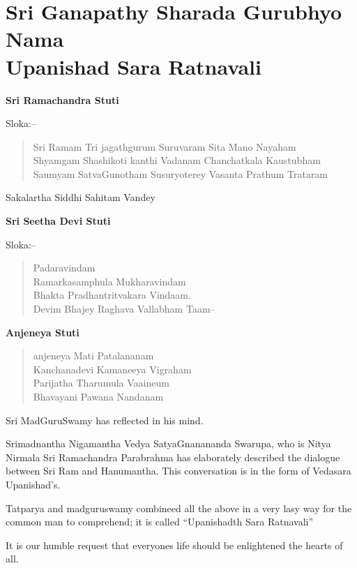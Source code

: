 
\chapter*{Sri Ganapathy Sharada Gurubhyo Nama\\ Upanishad Sara Ratnavali}

\begin{center}
\textbf{Sri Ramachandra Stuti}
\end{center}

Sloka:–

\begin{verse}
 Sri Ramam Tri jagathgurum Suruvaram Sita Mano Nayaham \\
 Shyamgam Shashikoti kanthi Vadanam Chanchatkala Kaustubham \\
 Saumyam SatvaGunotham Susuryoterey Vasanta Prathum Trataram
\end{verse}

\begin{center}
Sakalartha Siddhi Sahitam Vandey
\end{center}

\begin{center}
\end{center}

\begin{center}
\textbf{Sri Seetha Devi Stuti}
\end{center}

Sloka:–

\begin{verse}
  Padaravindam\\
 Ramarkasamphula Mukharavindam\\
 Bhakta Pradhantritvakara Vindaam.\\
 Devim Bhajey Raghava Vallabham Taam–
\end{verse}

\begin{center}
\textbf{Anjeneya Stuti}
\end{center}

\begin{verse}
 anjeneya Mati Patalananam \\
 Kanchanadevi Kamaneeya Vigraham\\
 Parijatha Tharumula Vaaineum\\
 Bhavayani Pawana Nandanam
\end{verse}

Sri MadGuruSwamy has reflected in his mind.

Srimadnantha Nigamantha Vedya SatyaGnanananda Swarupa, who is Nitya Nirmala Sri Ramachandra Parabrahma has elaborately described the dialogue between Sri Ram and Hanumantha. This conversation is in the form of Vedasara Upanishad's.

Tatparya and madguruswamy combineed all the above in a very lasy way for the common man to comprehend; it is called “Upanishadth Sara Ratnavali”

It is our humble request that everyones life should be enlightened the hearts of all.

\delimiter

